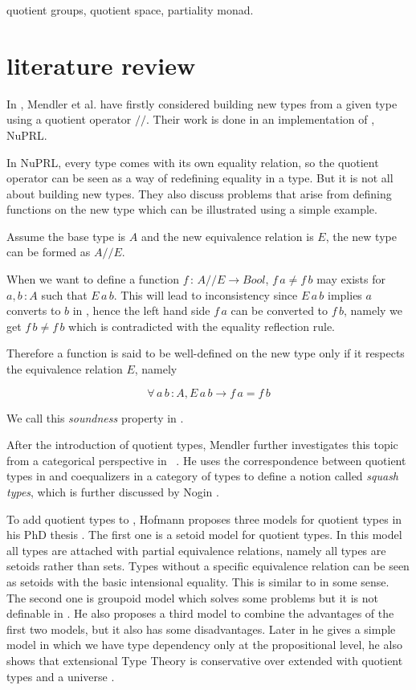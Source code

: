 quotient groups, quotient space, partiality monad.


\section{literature review}


In \cite{cab}, Mendler et al. have firstly considered building new types from a
given type using a quotient operator $//$. Their work is done in an
implementation of \ett, NuPRL. 

In NuPRL, every type comes with its own equality relation, so the quotient operator can be
seen as a way of redefining equality in a type. But it is not all
about building new types. They also discuss problems that arise from
defining functions on the new type which can be illustrated using a simple example. 

Assume the base type is $A$ and the new equivalence relation is $E$, the new
type can be formed as $A//E$. 

When we want to define a function $f \,\colon\, A//E \to Bool$,  $f\,a \not= f\,b$ may
exists for $a, b \,\colon A$ such that $E\,a\,b$. This will lead to
inconsistency since $E\,a\,b$ implies $a$ converts to $b$ in \ett{}, hence
the left hand side $f\,a$ can be converted to $f\,b$, namely we get $f\,b \not= f\,b$
which is contradicted with the equality reflection rule. 

Therefore a function is said to be well-defined \cite{cab} on the new type only
if it respects the equivalence relation $E$, namely

$$\forall \, a\,b\,\colon A, E\,a\,b \to f\,a = f\,b$$

We call this \emph{soundness} property in \cite{aan}.

 After the introduction of quotient types, Mendler further investigates
 this topic from a categorical perspective in ~\cite{men:90}. He uses
 the correspondence between quotient types in \mltt{} and coequalizers
 in a category of types to define a notion called \emph{squash types},
 which is further discussed by Nogin \cite{nog:02}.

To add quotient types to \mltt{}, Hofmann proposes  three models for
quotient types in his PhD thesis \cite{hof:phd}. The first one is a setoid model for
quotient types. In this model all types are attached with partial
equivalence relations, namely all types are setoids rather than
sets. Types without a specific equivalence relation can be seen as
setoids with the basic intensional equality. This is similar to
\ett{} in some sense. The second one is groupoid model which solves some problems
but it is not definable in \itt{}. He also proposes a third model to
combine the advantages of the first two models, but it also has some
disadvantages. Later in \cite{hof:95:sm} he gives a simple model in which we have type dependency only at the propositional level, he also shows that extensional Type Theory is conservative over \itt  extended with quotient types and a universe \cite{hof:95:con}.

